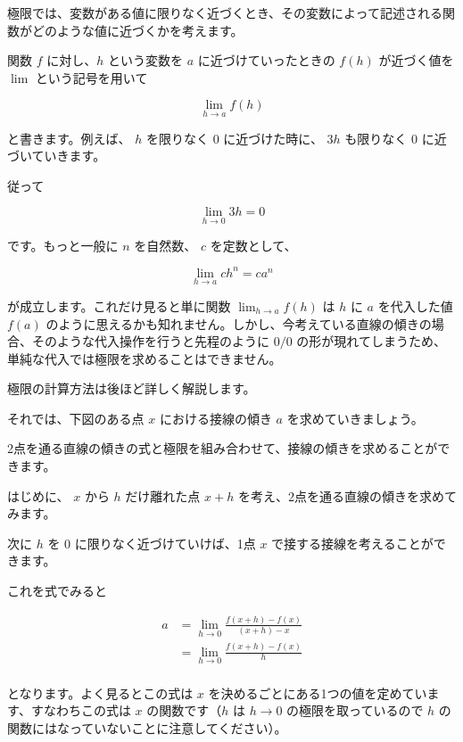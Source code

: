 極限では、変数がある値に限りなく近づくとき、その変数によって記述される関数がどのような値に近づくかを考えます。

関数 $f$ に対し、$h$ という変数を $a$ に近づけていったときの $f(h)$ が近づく値を $\lim$ という記号を用いて


\[
\displaystyle \lim _{h\rightarrow a} f(h)
\]


と書きます。例えば、 $h$ を限りなく $0$ に近づけた時に、 $3h$ も限りなく $0$ に近づいていきます。

従って


\[
\displaystyle \lim _{h\rightarrow 0} 3h=0
\]


です。もっと一般に $n$ を自然数、 $c$ を定数として、


\[
\displaystyle \lim _{h\rightarrow a} c h^n=c a^n
\]


が成立します。これだけ見ると単に関数 $\lim _{h\rightarrow a} f(h)$ は $h$ に $a$ を代入した値 $f(a)$ のように思えるかも知れません。しかし、今考えている直線の傾きの場合、そのような代入操作を行うと先程のように $0/0$ の形が現れてしまうため、単純な代入では極限を求めることはできません。

極限の計算方法は後ほど詳しく解説します。


それでは、下図のある点 $x$ における接線の傾き $a$ を求めていきましょう。




2点を通る直線の傾きの式と極限を組み合わせて、接線の傾きを求めることができます。




はじめに、 $x$ から $h$ だけ離れた点 $x + h$ を考え、2点を通る直線の傾きを求めてみます。

次に $h$ を $0$ に限りなく近づけていけば、1点 $x$ で接する接線を考えることができます。

これを式でみると


\[
\begin{aligned}
a
&= \lim_{h \rightarrow 0} \frac{f(x + h) - f(x)}{(x + h) - x} \\
&= \lim_{h \rightarrow 0} \frac{f(x + h) - f(x)}{h} \\
\end{aligned}
\]


となります。よく見るとこの式は $x$ を決めるごとにある1つの値を定めています、すなわちこの式は $x$ の関数です（$h$ は $h\to 0$ の極限を取っているので $h$ の関数にはなっていないことに注意してください）。

